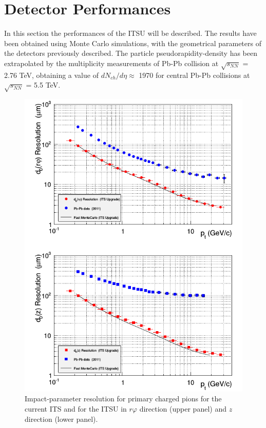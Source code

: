 \section{Detector Performances}
In this section the performances of the ITSU will be described. The results have been obtained using Monte Carlo simulations, with the geometrical parameters of the detectors previously described. The particle pseudorapidity-density has been extrapolated by the multiplicity measurements of Pb-Pb collision at $\sqrt{s_{NN}}$ = 2.76 TeV, obtaining a value of $dN_{ch}/d\eta \approx$ 1970 for central Pb-Pb collisions at $\sqrt{s_{NN}}$ = 5.5 TeV.
%
\begin{figure}
  \centering
  \includegraphics[scale=0.6]{figures/impactsim.png}
  \caption{Impact-parameter resolution for primary charged pions for the current ITS and for the ITSU in $r\varphi$ direction (upper panel) and $z$ direction (lower panel)\cite{uptdr}.}
  \label{fig:impactsim}
\end{figure}
